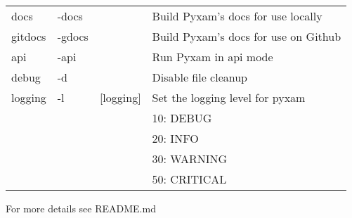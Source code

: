 \documentclass[9pt]{extarticle}
\begin{document}
\begin{multicols}{2}
\begin{tabular}{l l l l}
docs         & -docs  &                & Build Pyxam's docs for use locally \\
gitdocs      & -gdocs &                & Build Pyxam's docs for use on Github \\
api          & -api   &                & Run Pyxam in api mode \\
debug        & -d     &                & Disable file cleanup \\
logging      & -l     & [logging]      & Set the logging level for pyxam \\
             &        &                & 10: DEBUG \\
             &        &                & 20: INFO \\
             &        &                & 30: WARNING \\
             &        &                & 50: CRITICAL \\
\end{tabular} 

For more details see README.md \\

\end{multicols}
\end{document}
